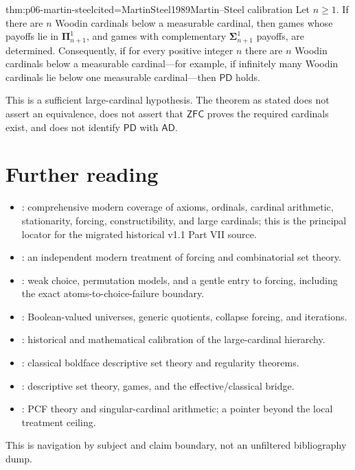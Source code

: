 \begin{hbtheorem}{thm:p06-martin-steel}{cited=MartinSteel1989}{Martin--Steel calibration}
Let \(n\geq1\).  If there are \(n\) Woodin cardinals below a measurable
cardinal, then games whose payoffs lie in
\(\boldsymbol{\Pi}^{1}_{n+1}\), and games with complementary
\(\boldsymbol{\Sigma}^{1}_{n+1}\) payoffs, are determined.  Consequently, if
for every positive integer \(n\) there are \(n\) Woodin cardinals below a
measurable cardinal---for example, if infinitely many Woodin cardinals lie
below one measurable cardinal---then \(\mathsf{PD}\) holds.

This is a sufficient large-cardinal hypothesis.  The theorem as stated does
not assert an equivalence, does not assert that \(\mathsf{ZFC}\) proves the
required cardinals exist, and does not identify \(\mathsf{PD}\) with
\(\mathsf{AD}\).
\end{hbtheorem}

\section{Further reading}
\label{sec:p06-further-reading}

\begin{itemize}
\item \textcite{Jech2003}: comprehensive modern coverage of axioms,
ordinals, cardinal arithmetic, stationarity, forcing, constructibility, and
large cardinals; this is the principal locator for the migrated historical
v1.1 Part VII source.
\item \textcite{Kunen2011}: an independent modern treatment of forcing and
combinatorial set theory.
\item \textcite{Halbeisen2017}: weak choice, permutation models, and a gentle
entry to forcing, including the exact atoms-to-choice-failure boundary.
\item \textcite{Bell2005}: Boolean-valued universes, generic quotients,
collapse forcing, and iterations.
\item \textcite{Kanamori2003}: historical and mathematical calibration of
the large-cardinal hierarchy.
\item \textcite{Kechris1995}: classical boldface descriptive set theory and
regularity theorems.
\item \textcite{Moschovakis2009}: descriptive set theory, games, and the
effective/classical bridge.
\item \textcite{Shelah1994Cardinal}: PCF theory and singular-cardinal
arithmetic; a pointer beyond the local treatment ceiling.
\end{itemize}

This is navigation by subject and claim boundary, not an unfiltered
bibliography dump.
